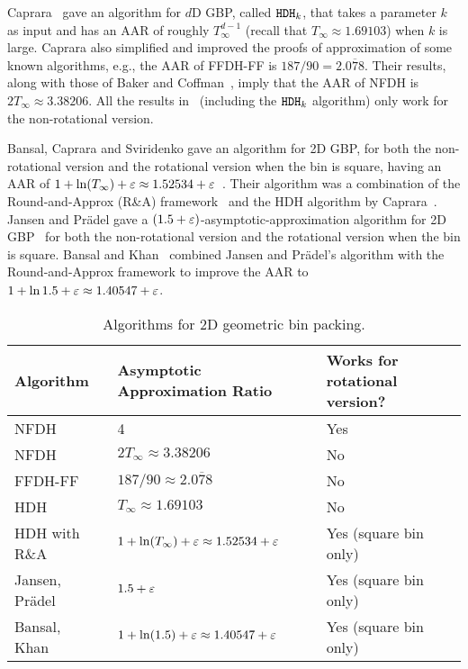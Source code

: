 Caprara~\cite{caprara2008} gave an algorithm for $d$D GBP, called $\operatorname{\mathtt{HDH}}_{k}$,
that takes a parameter $k$ as input and has an AAR of roughly
$T_{\infty}^{d-1}$ (recall that $T_{\infty} \approx 1.69103$) when $k$ is large.
Caprara also simplified and improved the proofs of approximation of some known algorithms,
e.g., the AAR of FFDH-FF is $187/90 = 2.0\overline{7}8$.
Their results, along with those of Baker and Coffman~\cite{baker1981tight},
imply that the AAR of NFDH is $2T_{\infty} \approx 3.38206$.
All the results in~\cite{caprara2008} (including the $\operatorname{\mathtt{HDH}}_{k}$ algorithm)
only work for the non-rotational version.

Bansal, Caprara and Sviridenko gave an algorithm for 2D GBP,
for both the non-rotational version and the rotational version when the bin is square,
having an AAR of $1 + \ln(T_{\infty}) + \varepsilon \approx 1.52534 + \varepsilon$~\cite{rna}.
Their algorithm was a combination of the Round-and-Approx (R\&A) framework~\cite{rna}
and the HDH algorithm by Caprara~\cite{caprara2008}.
Jansen and Pr\"adel gave a $(1.5 + \varepsilon)$-asymptotic-approximation
algorithm for 2D GBP~\cite{JansenP2013,jansen2016new}
for both the non-rotational version and the rotational version when the bin is square.
Bansal and Khan~\cite{bansal2014binpacking} combined Jansen and Pr\"adel's algorithm
with the Round-and-Approx framework to improve the AAR to
$1 + \ln 1.5 + \varepsilon \approx 1.40547 + \varepsilon$.

\begin{table}[ht]
\centering
\caption{Algorithms for 2D geometric bin packing.}
\begin{tabular}{lll}
\toprule Algorithm & Asymptotic Approximation Ratio & Works for rotational version?
\\ \midrule NFDH~\cite{coffman1980performance}
    & 4 & Yes
\\[\defaultaddspace] NFDH~\cite{coffman1980performance,caprara2008,baker1981tight}
    & $2T_{\infty} \approx 3.38206$ & No
\\[\defaultaddspace] FFDH-FF~\cite{coffman1980performance,caprara2008}
    & $187/90 \approx 2.0\overline{7}8$ & No
\\[\defaultaddspace] HDH~\cite{caprara2008}
    & $T_\infty \approx 1.69103$ & No
\\[\defaultaddspace] HDH with R\&A~\cite{rna}
    & $1 + \ln(T_\infty) + \varepsilon \approx 1.52534 + \varepsilon$
    & Yes (square bin only)
\\[\defaultaddspace] Jansen, Pr\"adel~\cite{JansenP2013,jansen2016new}
    & $1.5 + \varepsilon$
    & Yes (square bin only)
\\[\defaultaddspace] Bansal, Khan~\cite{bansal2014binpacking}
    & $1 + \ln(1.5) + \varepsilon \approx 1.40547 + \varepsilon$
    & Yes (square bin only)
\\ \bottomrule
\end{tabular}
\label{table:2gbp}
\end{table}

